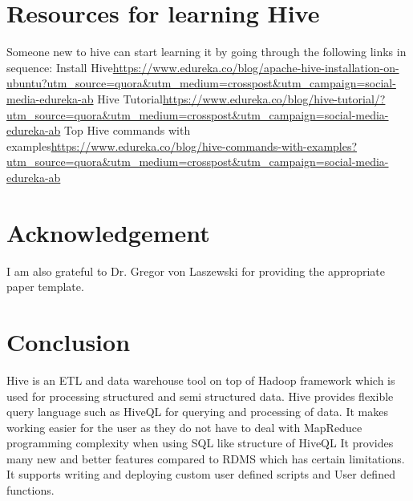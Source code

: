 \documentclass[9pt,twocolumn,twoside]{../../styles/osajnl}
\begin{document}
\section{Resources for learning Hive}
Someone new to hive can start learning it by going through the following links in sequence:
Install Hive\url{https://www.edureka.co/blog/apache-hive-installation-on-ubuntu?utm_source=quora&utm_medium=crosspost&utm_campaign=social-media-edureka-ab}\newline
Hive Tutorial\url{https://www.edureka.co/blog/hive-tutorial/?utm_source=quora&utm_medium=crosspost&utm_campaign=social-media-edureka-ab}\newline
Top Hive commands with examples\url{https://www.edureka.co/blog/hive-commands-with-examples?utm_source=quora&utm_medium=crosspost&utm_campaign=social-media-edureka-ab}\newline

\section{Acknowledgement}
I am also grateful to Dr. Gregor von Laszewski for providing the appropriate paper template.


\section{Conclusion}
Hive is an ETL and data warehouse tool on top of Hadoop framework which is used for processing structured and semi structured data.\newline
Hive provides flexible query language such as HiveQL for querying and processing of data.\newline
It makes working easier for the user as they do not have to deal with MapReduce programming complexity when using SQL like structure of HiveQL\newline
It provides many new and better features compared to RDMS which has certain limitations.\newline
It supports writing and deploying custom user defined scripts and User defined functions.\newline




\end{document}
